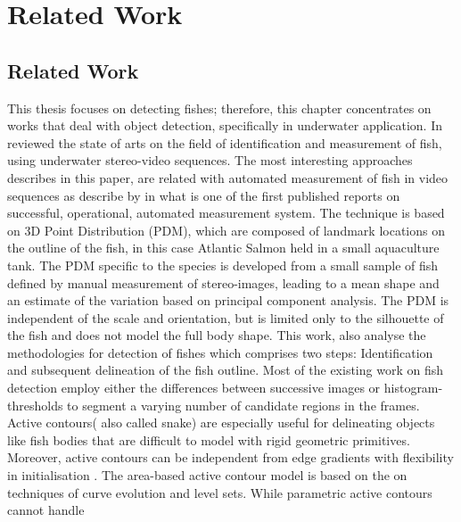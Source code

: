 \chapter{Related Work}
\label{chapter:Related Work}



 
\section{Related Work}
This thesis focuses on detecting fishes; therefore, this chapter concentrates on
works that deal with object detection, specifically in underwater application.
In \citet{Shortis2013} reviewed the state of arts on the field of identification 
and measurement of fish, using underwater stereo-video sequences. The most interesting 
approaches describes in this paper, are related with automated measurement of fish 
in video sequences as describe by \citet{Tillett2000} in what is one of the first 
published reports on successful, operational, automated measurement system. The 
technique is based on 3D Point Distribution (PDM), which are composed of landmark 
locations on the outline of the fish, in this case Atlantic Salmon held in a small 
aquaculture tank. The PDM specific to the species is developed from a small sample 
of fish defined by manual measurement of stereo-images, leading to a mean shape 
and an estimate of the variation based on principal component analysis. The PDM 
is independent of the scale and orientation, but is limited only to the silhouette 
of the fish and does not model the full body shape.
This work, also analyse the methodologies for detection of fishes which comprises
two steps: Identification and subsequent delineation of the fish outline. Most of the
existing work on fish detection employ either the differences between successive 
images \citet{Spampinato2008,Tillett2000} or histogram-thresholds to segment a 
varying number of candidate regions in the frames. Active contours( also called snake)
are especially useful for delineating objects like fish bodies that are difficult to 
model with rigid geometric primitives. Moreover, active contours can be independent 
from edge gradients with flexibility in initialisation \citep{Chan2001}. 
The area-based active contour model \citet{Chan2001} is based on the on techniques 
of curve evolution and level sets. While parametric active contours cannot handle 
